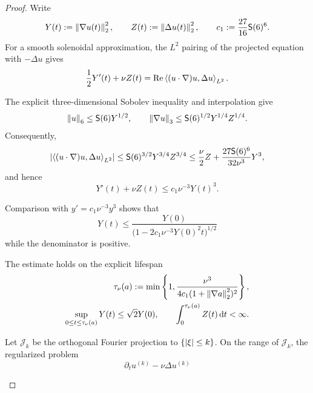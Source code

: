 \begin{proof}
Write
\[
 Y(t):=\left\lVert \nabla u(t)\right\rVert_2^2,
 \qquad
 Z(t):=\left\lVert \Delta u(t)\right\rVert_2^2,
 \qquad
 c_1:=\frac{27}{16}\mathsf S(6)^6.
\]
For a smooth solenoidal approximation, the \(L^2\) pairing of the projected
equation with \(-\Delta u\) gives
\begin{equation}
 \frac12Y'(t)+\nu Z(t)
 =\operatorname{Re}\left\langle (u\cdot\nabla)u,\Delta u\right\rangle_{L^2}.
 \label{eq:qc-H1-energy-pairing}
\end{equation}
\begin{samepage}
The explicit three-dimensional Sobolev inequality and interpolation give
\[
 \left\lVert u\right\rVert_6\le\mathsf S(6)Y^{1/2},
 \qquad
 \left\lVert \nabla u\right\rVert_3
 \le\mathsf S(6)^{1/2}Y^{1/4}Z^{1/4}.
\]
Consequently,
\[
 \left|\left\langle (u\cdot\nabla)u,\Delta u\right\rangle_{L^2}\right|
 \le \mathsf S(6)^{3/2}Y^{3/4}Z^{3/4}
 \le\frac\nu2Z+\frac{27\mathsf S(6)^6}{32\nu^3}Y^3,
\]
and hence
\begin{equation}
 Y'(t)+\nu Z(t)\le c_1\nu^{-3}Y(t)^3.
 \label{eq:qc-H1-ode}
\end{equation}
\par
\end{samepage}
\begin{samepage}
Comparison with \(y'=c_1\nu^{-3}y^3\) shows that
\begin{equation}
 Y(t)\le
 \frac{Y(0)}{\bigl(1-2c_1\nu^{-3}Y(0)^2t\bigr)^{1/2}}
 \label{eq:qc-H1-local-explicit}
\end{equation}
while the denominator is positive.
\par
\end{samepage}
\begin{samepage}
The estimate holds on the explicit lifespan
\begin{equation}
 \begin{aligned}
 \tau_\nu(a):=
 \min\left\{1,
 \frac{\nu^3}{4c_1(1+\left\lVert \nabla a\right\rVert_2^2)^2}
 \right\},\\
 \sup_{0\le t\le\tau_\nu(a)}Y(t)\le\sqrt2Y(0),
 \qquad
 \int_0^{\tau_\nu(a)}Z(t)\,\mathrm d t<\infty.
 \end{aligned}
 \label{eq:qc-H1-local-lifespan}
\end{equation}
\par
\end{samepage}
\begin{samepage}
Let \(\mathcal J_k\) be the orthogonal Fourier projection to
\(\{\left|\xi\right|\le k\}\).  On the range of \(\mathcal J_k\), the regularized
problem
\begin{equation}
 \partial_tu^{(k)}-\nu\Delta u^{(k)}

\end{equation}
\end{samepage}
\end{proof}
